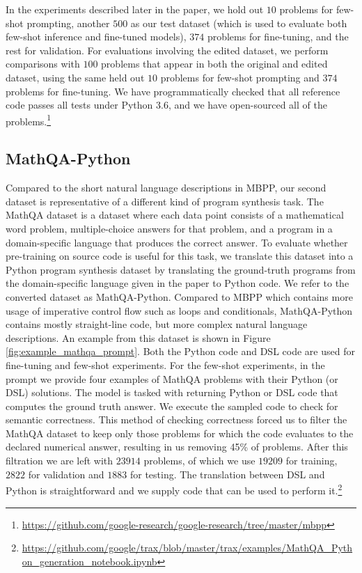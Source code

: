 In the experiments described later in the paper, we hold out $10$ problems for few-shot prompting, another $500$ as our test dataset (which is used to evaluate both few-shot inference and fine-tuned models), $374$ problems for fine-tuning, and the rest for validation. For evaluations involving the edited dataset, we perform comparisons with $100$ problems that appear in both the original and edited dataset, using the same held out $10$ problems for few-shot prompting and $374$ problems for fine-tuning. We have programmatically checked that all reference code passes all tests under Python 3.6, and we have open-sourced all of the problems.\footnote{\url{https://github.com/google-research/google-research/tree/master/mbpp}}

\subsection{MathQA-Python}
\label{sec:datasets:mathqa}

Compared to the short natural language descriptions in MBPP, our second dataset is representative of a different kind of program synthesis task. The MathQA dataset \citep{MATHQA} is a dataset where each data point consists of a mathematical word problem, multiple-choice answers for that problem, and a program in a domain-specific language that produces the correct answer. To evaluate whether pre-training on source code is useful for this task, we translate this dataset into a Python program synthesis dataset by translating the ground-truth programs from the domain-specific language given in the paper to Python code. We refer to the converted dataset as MathQA-Python. Compared to MBPP which contains more usage of imperative control flow such as loops and conditionals,  MathQA-Python contains mostly straight-line code, but more complex natural language descriptions. An example from this dataset is shown in Figure \ref{fig:example_mathqa_prompt}.
Both the Python code and DSL code are used for fine-tuning and few-shot experiments. For the few-shot experiments, in the prompt we provide four examples of MathQA problems with their Python (or DSL) solutions. The model is tasked with returning Python or DSL code that computes the ground truth answer. We execute the sampled code to check for semantic correctness. This method of checking correctness forced us to filter the MathQA dataset to keep only those problems for which the code evaluates to the declared numerical answer, resulting in us removing 45\% of problems. After this filtration we are left with $23914$ problems, of which we use $19209$ for training, $2822$ for validation and $1883$ for testing. The translation between DSL and Python is straightforward and we supply code that can be used to perform it.\footnote{\url{https://github.com/google/trax/blob/master/trax/examples/MathQA_Python_generation_notebook.ipynb}} 

